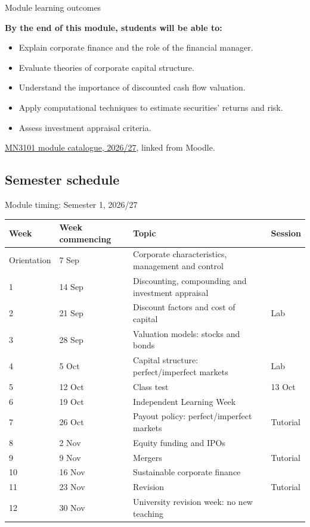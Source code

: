 \documentclass[9pt,aspectratio=169]{beamer}
\begin{document}
\begin{frame}{Module learning outcomes}

\textbf{By the end of this module, students will be able to:}
\begin{itemize}
\item Explain corporate finance and the role of the financial manager.
\item Evaluate theories of corporate capital structure.
\item Understand the importance of discounted cash flow valuation.
\item Apply computational techniques to estimate securities' returns and risk.
\item Assess investment appraisal criteria.
\end{itemize}
\smallskip
{\footnotesize\href{https://www.st-andrews.ac.uk/subjects/modules/catalogue/?meta_semester_sand=1\&meta_modulecode=MN3101\&meta_ayrs_sand=2026\%2F7}{MN3101 module catalogue, 2026/27}, linked from Moodle.\par}

\end{frame}

\subsection{Semester schedule}

\begin{frame}{Module timing: Semester 1, 2026/27}
\begingroup
\renewcommand{\arraystretch}{1.0}
\setlength{\tabcolsep}{3pt}
\begin{tabularx}{\textwidth}{@{}l l >{\raggedright\arraybackslash}X l@{}}
\toprule
\textbf{Week} & \textbf{Week commencing} & \textbf{Topic} & \textbf{Session} \\
\midrule
Orientation & 7 Sep & Corporate characteristics, management and control & \\
1 & 14 Sep & Discounting, compounding and investment appraisal & \\
2 & 21 Sep & Discount factors and cost of capital & Lab \\
3 & 28 Sep & Valuation models: stocks and bonds & \\
4 & 5 Oct & Capital structure: perfect/imperfect markets & Lab \\
5 & 12 Oct & Class test & 13 Oct \\
6 & 19 Oct & Independent Learning Week & \\
7 & 26 Oct & Payout policy: perfect/imperfect markets & Tutorial \\
8 & 2 Nov & Equity funding and IPOs & \\
9 & 9 Nov & Mergers & Tutorial \\
10 & 16 Nov & Sustainable corporate finance & \\
11 & 23 Nov & Revision & Tutorial \\
12 & 30 Nov & University revision week: no new teaching & \\
\bottomrule
\end{tabularx}
\endgroup
\end{frame}
\end{document}
